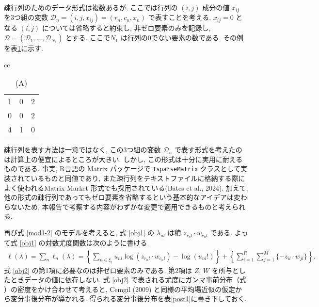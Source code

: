 \documentclass[paper=a4,10.5pt]{jsarticle} %
\numberwithin{equation}{section} %
\begin{document}
疎行列のためのデータ形式は複数あるが, ここでは行列の $(i,j)$ 成分の値 $x_{ij}$ を3つ組の変数 $ \mathcal{D}_n  = (i,j,x_{ij})=(r_n, c_n, x_n)$ で表すことを考える.  $x_{ij}=0$ となる $(i,j)$ については省略すると約束し, 非ゼロ要素のみを記録し, $\mathcal{D}=(\mathcal{D}_1, \ldots, \mathcal{D}_{N_1})$ とする. ここで$N_1$ は行列の0でない要素の数である. その例を表\ref{tab1}に示す. 
\renewcommand{\arraystretch}{0.9}
\begin{table}[tbp]
\centering
\caption{疎行列の例. (A)と(B)は同じ情報を持つ. (B)は本研究で扱う疎行列の形式である. }\label{tab1}
\begin{tabular}{cc}
\begin{subtable}{0.2\linewidth}\centering
{
\caption*{(A)}
\begin{tabular}{|ccc|}
\hline
1 & 0 & 2\\
0 & 0 & 2\\
4 & 1 & 0\\
\hline
\end{tabular}
}
\end{subtable}
\begin{subtable}{0.2\linewidth}
\end{subtable}
\end{tabular}
\end{table}
\renewcommand{\arraystretch}{1}
疎行列を表す方法は一意ではなく, この3つ組の変数 $\mathcal{D}_n$ で表す形式を考えたのは計算上の便宜によるところが大きい. しかし, この形式は十分に実用に耐えるものである. 事実, R言語の Matrix パッケージで \verb|TsparseMatrix| クラスとして実装されているものと同値であり, また疎行列をテキストファイルに格納する際によく使われるMatrix Market 形式でも採用されている(Bates et al., 2024).  %
加えて, 他の形式の疎行列であってもゼロ要素を省略するという基本的なアイデアは変わらないため, 本報告で考察する内容がわずかな変更で適用できるものと考えられる.

再び式 \eqref{mod1-2} のモデルを考えると, 式 \eqref{obj1} の $\lambda_{nl}$ は積 $ z_{r_nl} \cdot w_{c_nl}$ である. よって式 \eqref{obj1} の対数尤度関数は次のように書ける. 
\begin{align}
\ell (\lambda) = \sum_n \ell_n (\lambda) = \left\{ \sum_{n \in \xi_1} u_{nl} \log(z_{r_nl} \cdot w_{c_nl})  - \log(u_{nl}!) \right\} + \left\{  \sum_{i=1}^{R}\sum_{j=1}^M  \{-  z_{il}  \cdot w_{jl}\} \right\}. \label{obj2}
\end{align}
式 \eqref{obj2} の第1項に必要なのは非ゼロ要素のみである. 第2項は $Z$, $W$ を所与としたときデータの値に依存しない. 式 \eqref{obj2} で表される尤度にガンマ事前分布（式 ）の密度をかけ合わせて考えると,  Cemgil (2009) と同様の平均場近似の仮定から変分事後分布が導かれる. 得られる変分事後分布を表\ref{post1}に書き下しておく.
\end{document}

